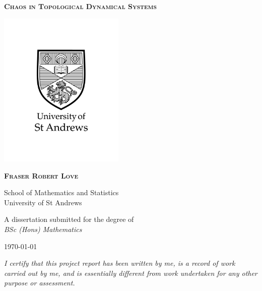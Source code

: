 \documentclass[11pt,a4paper,oneside]{memoir}
\theoremstyle{plain}
\theoremstyle{definition}
\begin{document}
\OnehalfSpacing

\begin{titlingpage}
    \centering

        \vspace{1cm}
 
        \Huge
        \parbox{10cm}{\begin{center}{\scshape \textbf{Chaos in Topological Dynamical Systems}}\end{center}}


        \includegraphics[width=6cm]{uni_logo}

        
        \LARGE
        {\scshape \textbf{Fraser Robert Love}}
             
        \vspace{0.75cm}
             
        \large

        School of Mathematics and Statistics\\
        University of St Andrews\\

        \vspace{3cm}

        A dissertation submitted for the degree of\\
        \textit{BSc (Hons) Mathematics}\\

        \vfill

        {\large \today\par}
 \end{titlingpage}

\vspace*{2.5cm}

\noindent\textit{I certify that this project report has been written by me, is a record of work carried out by me, and is essentially different from work undertaken for any other purpose or assessment.}
\end{document}
